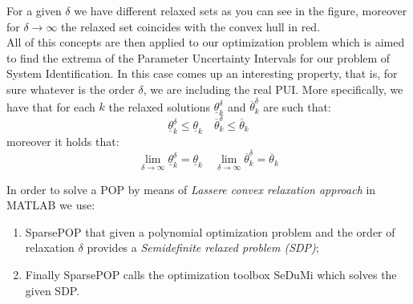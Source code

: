 For a given $\delta$ we have different relaxed sets as you can see in the figure, moreover for $\delta\to\infty$ the relaxed set coincides with the convex hull in red.\\
All of this concepts are then applied to our optimization problem which is aimed to find the extrema of the Parameter Uncertainty Intervals for our problem of System Identification. In this case comes up an interesting property, that is, for sure whatever is the order $\delta$, we are including the real PUI. More specifically, we have that for each $k$ the relaxed solutions $\underline{\theta}_k^{\delta}$ and $\overline{\theta}_k^{\delta}$ are such that:
{\large{
    \begin{equation}
        \underline{\theta}_k^{\delta} \le \underline{\theta}_k
        \quad 
        \overline{\theta}_k^{\delta} \le \overline{\theta}_k
    \end{equation}
}}
moreover it holds that: 
\begin{equation}
    \lim_{\delta\to\infty} \underline{\theta}_k^{\delta} = \underline{\theta}_k \quad
    \lim_{\delta\to\infty} \overline{\theta}_k^{\delta} = \overline{\theta}_k
\end{equation}

In order to solve a POP by means of \textit{Lassere convex  relaxation approach} in MATLAB we use:
\begin{enumerate}
    \item \textsf{SparsePOP} that given a polynomial optimization problem and the order of relaxation $\delta$ provides a \textit{Semidefinite relaxed problem (SDP)};
    \item Finally \textsf{SparsePOP} calls the optimization toolbox \textsf{SeDuMi} which solves  the given SDP. 
\end{enumerate}
 


